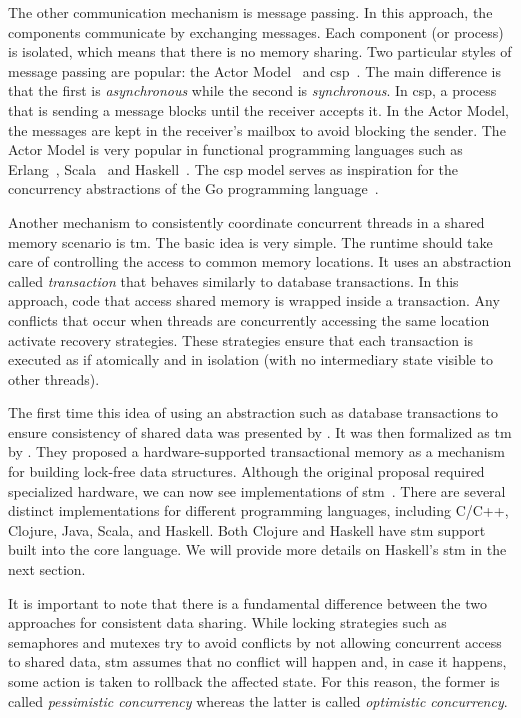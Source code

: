 The other communication mechanism is message passing. In this approach, the components communicate by exchanging messages. Each component (or process) is isolated, which means that there is no memory sharing. Two particular styles of message passing are popular: the Actor Model~\cite{agha:1986} and \ac{csp}~\cite{hoare:1978}. The main difference is that the first is \emph{asynchronous} while the second is \emph{synchronous}. In \acs{csp}, a process that is sending a message blocks until the receiver accepts it. In the Actor Model, the messages are kept in the receiver's mailbox to avoid blocking the sender. The Actor Model is very popular in functional programming languages such as Erlang~\cite{armstrong:2007}, Scala~\cite{haller:2009} and Haskell~\cite{epstein:2011}. The \acs{csp} model serves as inspiration for the concurrency abstractions of the Go programming language~\cite{pike:2012}.

Another mechanism to consistently coordinate concurrent threads in a shared memory scenario is \ac{tm}. The basic idea is very simple. The runtime should take care of controlling the access to common memory locations. It uses an abstraction called \emph{transaction} that behaves similarly to database transactions. In this approach, code that access shared memory is wrapped inside a transaction. Any conflicts that occur when threads are concurrently accessing the same location activate recovery strategies. These strategies ensure that each transaction is executed as if atomically and in isolation (with no intermediary state visible to other threads).

The first time this idea of using an abstraction such as database transactions to ensure consistency of shared data was presented by . It was then formalized as \acl{tm} by . They proposed a hardware-supported transactional memory as a mechanism for building lock-free data structures. Although the original proposal required specialized hardware, we can now see implementations of \ac{stm}~\cite{shavit:1995}. There are several distinct implementations for different programming languages, including C/C++, Clojure, Java, Scala, and Haskell. Both Clojure and Haskell have  \acs{stm} support built into the core language. We will provide more details on Haskell's \acs{stm} in the next section.

It is important to note that there is a fundamental difference between the two approaches for consistent data sharing. While locking strategies such as semaphores and mutexes try to avoid conflicts by not allowing concurrent access to shared data, \acs{stm} assumes that no conflict will happen and, in case it happens, some action is taken to rollback the affected state. For this reason, the former is called \emph{pessimistic concurrency} whereas the latter is called \emph{optimistic concurrency}.


